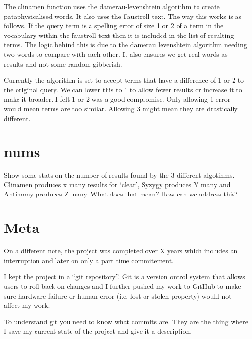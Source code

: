 The clinamen function uses the damerau-levenshtein algorithm to create pataphysicalised words. It also uses the Faustroll text. The way this works is as follows. If the query term is a spelling error of size 1 or 2 of a term in the vocabulary within the faustroll text then it is included in the list of resulting terms. The logic behind this is due to the damerau levenshtein algorithm needing two words to compare with each other. It also ensures we get real words as results and not some random gibberish.

Currently the algorithm is set to accept terms that have a difference of 1 or 2 to the original query. We can lower this to 1 to allow fewer results or increase it to make it broader. I felt 1 or 2 was a good compromise. Only allowing 1 error would mean terms are too similar. Allowing 3 might mean they are drastically different.



\section{nums}
Show some stats on the number of results found by the 3 different algotihms.
Clinamen produces x many results for `clear', Syzygy produces Y many and Antinomy produces Z many.
What does that mean? How can we address this?



\section{Meta}


On a different note, the project was completed over X years which includes an interruption and later on only a part time commitement.

I kept the project in a ``git repository''. Git is a version ontrol system that allows users to roll-back on changes and I further pushed my work to GitHub to make sure hardware failure or human error (i.e. lost or stolen property) would not affect my work. 

To understand git you need to know what commits are. They are the thing where I save my current state of the project and give it a description.

